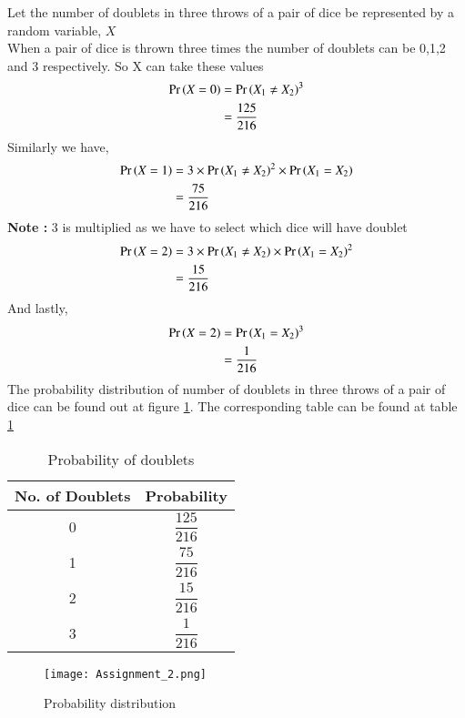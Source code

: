 \documentclass[journal,12pt,twocolumn]{IEEEtran}
\begin{document}
Let the number of doublets in three throws of a pair of dice be represented by a random variable, $X$ \\
When a pair of dice is thrown three times the number of doublets can be 0,1,2 and 3 respectively. So X can take these values
\begin{align}
    \Pr\left(X =0\right) &= {\Pr\left(X_1 \neq X_2\right)}^3   \\
        & = \dfrac{125}{216}
\end{align}
Similarly we have, 
\begin{align}
    \Pr\left(X =1\right) &= 3 \times {\Pr\ensuremath{\left(X_1 \neq X_2\right)}}^2 \times \Pr\left(X_1 = X_2\right)   \\
        & = \dfrac{75}{216}
\end{align}
\textbf{Note :} 3 is multiplied as we have to select which dice will have doublet
\begin{align}
    \Pr\left(X =2\right) &= 3 \times \Pr\left(X_1 \neq X_2\right) \times {\Pr\ensuremath{\left(X_1 = X_2\right)}}^2 \\
        & = \dfrac{15}{216}
\end{align}
And lastly,
\begin{align}
    \Pr\left(X =2\right) &= {\Pr\left(X_1 = X_2\right)}^3   \\
        & = \dfrac{1}{216}
\end{align}
The probability distribution of number of doublets in three throws of a pair of dice can be found out at figure \ref{Probability distribution}. The corresponding table can be found at table  \ref{tab:Probability of doublets} 
\begin{table}[hbt!]
\centering
\begin{tabular}{|c|c|}
\hline
\textbf{No. of Doublets} & \textbf{Probability} \\ \hline
0                        & $\dfrac{125}{216}$              \\ \hline
1                        & $\dfrac{75}{216}$               \\ \hline
2                        & $\dfrac{15}{216}$               \\ \hline
3                        & $\dfrac{1}{216}$                \\ \hline
\end{tabular}
\caption{Probability of doublets}
\label{tab:Probability of doublets}
\end{table}
\begin{figure}[h!]
    \centering
    \texttt{[image: Assignment\_2.png]}
    \caption{Probability distribution}
    \label{Probability distribution}
\end{figure}
\end{document}
